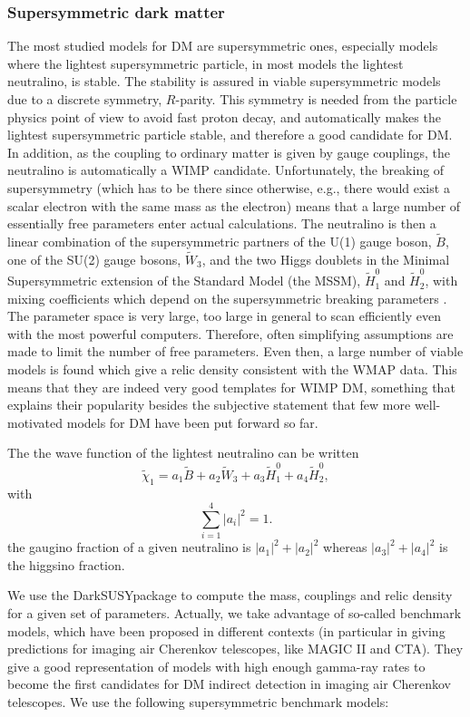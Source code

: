 \documentclass[10pt,aps,pra,reprint,amsmath,amsfonts,amssymb,showpacs,nofootinbib,floatfix]{revtex4-1}
\newcommand{\ds}{{\sc DarkSUSY}}
\begin{document}
\subsubsection{Supersymmetric dark matter}
The most studied models for DM are supersymmetric ones, especially
models where the lightest supersymmetric particle, in most models the
lightest neutralino, is stable. The stability is assured in viable
supersymmetric models due to a discrete symmetry, $R$-parity. This
symmetry is needed from the particle physics point of view to avoid
fast proton decay, and automatically makes the lightest supersymmetric
particle stable, and therefore a good candidate for DM. In addition,
as the coupling to ordinary matter is given by gauge couplings, the
neutralino is automatically a WIMP candidate. Unfortunately, the
breaking of supersymmetry (which has to be there since otherwise,
e.g., there would exist a scalar electron with the same mass as the
electron) means that a large number of essentially free parameters
enter actual calculations.  The neutralino is then a linear
combination of the supersymmetric partners of the U(1) gauge boson,
$\tilde B$, one of the SU(2) gauge bosons, $\tilde W_3$, and the two
Higgs doublets in the Minimal Supersymmetric extension of the Standard
Model (the MSSM), $\tilde H_1^0$ and $\tilde H_2^0$, with mixing
coefficients which depend on the supersymmetric breaking parameters
\cite{1984NuPhB.238..453E}. The parameter space is very large, too
large in general to scan efficiently even with the most powerful
computers. Therefore, often simplifying assumptions are made to limit
the number of free parameters. Even then, a large number of viable
models is found which give a relic density consistent with the WMAP
data. This means that they are indeed very good templates for WIMP DM,
something that explains their popularity besides the subjective
statement that few more well-motivated models for DM have been put forward
so far.

The the wave function of the lightest neutralino can be written
\begin{equation}
\tilde\chi_1=a_1\tilde B+a_2\tilde W_3+a_3 \tilde H_1^0+a_4\tilde H_2^0,
\end{equation}
with 
\begin{equation}
\sum_{i=1}^4 |a_i|^2=1.
\end{equation}
the gaugino fraction of a given neutralino is $|a_1|^2+|a_2|^2$
whereas $|a_3|^2+|a_4|^2$ is the higgsino fraction.


We use the \ds package \cite{ds} to compute the mass, couplings and
relic density for a given set of parameters.  Actually, we take
advantage of so-called benchmark models, which have been proposed in
different contexts (in particular in \cite{Bringmann:2008kj} giving
predictions for imaging air Cherenkov telescopes, like  MAGIC II and CTA). They give a good
representation of models with high enough gamma-ray rates to become
the first candidates for DM indirect detection in imaging air
Cherenkov telescopes. We use the following supersymmetric benchmark
models:
\end{document}
